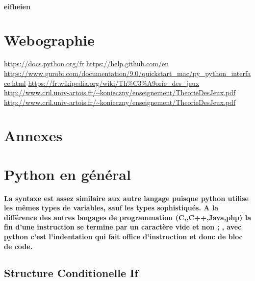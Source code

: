 \documentclass[a4paper, 12pt, twoside]{article}
\begin{document}
\paragraph{eifheien}




\newpage
\section{Webographie}
\begin{thebibliography}{2}
    \url{https://docs.python.org/fr}\newline
      \url{https://help.github.com/en}\newline
         \url{https://www.gurobi.com/documentation/9.0/quickstart_mac/py_python_interface.html}\newline
   \url{https://fr.wikipedia.org/wiki/Th\%C3\%A9orie_des_jeux}\newline
   \url{http://www.cril.univ-artois.fr/~konieczny/enseignement/TheorieDesJeux.pdf}\newline
   \url{http://www.cril.univ-artois.fr/~konieczny/enseignement/TheorieDesJeux.pdf}\newline
\end{thebibliography}



\newpage
\section{Annexes}
\appendix
\makeatletter
\def\@seccntformat#1{Annexe~\csname the#1\endcsname:\quad}
\makeatother
\newpage
\section{Python en général}
\paragraph{La syntaxe est assez similaire aux autre langage puisque python utilise les mêmes types de variables, sauf les types sophistiqués. A la différence des autres langages de programmation (C,,C++,Java,php) la fin d'une instruction se termine par un caractère vide
et non  ; , avec python c'est l'indentation qui fait office d'instruction et donc de bloc de code.}
\subsection{ Structure Conditionelle If }
\end{document}
